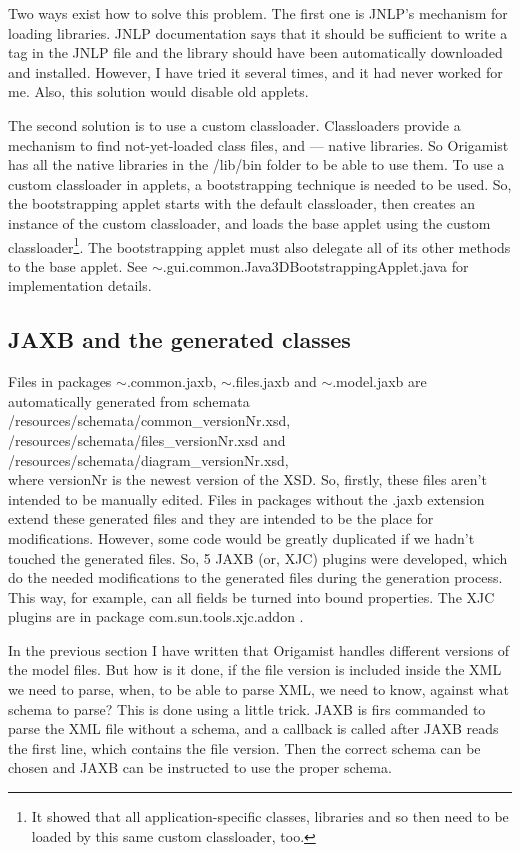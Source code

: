 Two ways exist how to solve this problem. The first one is JNLP's mechanism for loading libraries. JNLP documentation says that it should be sufficient to write a tag in the JNLP file and the library should have been automatically downloaded and installed. However, I have tried it several times, and it had never worked for me. Also, this solution would disable old applets.

The second solution is to use a custom classloader. Classloaders provide a mechanism to find not-yet-loaded class files, and --- native libraries. So Origamist has all the native libraries in the /lib/bin folder to be able to use them. To use a custom classloader in applets, a bootstrapping technique is needed to be used. So, the bootstrapping applet starts with the default classloader, then creates an instance of the custom classloader, and loads the base applet using the custom classloader\footnote{It showed that all application-specific classes, libraries and so then need to be loaded by this same custom classloader, too.}. The bootstrapping applet must also delegate all of its other methods to the base applet. See $\sim$.gui.common.Java3DBootstrappingApplet.java for implementation details.

\subsection{JAXB and the generated classes}
\label{ssec:jaxbClasses}
Files in packages $\sim$.common.jaxb, $\sim$.files.jaxb and $\sim$.model.jaxb are automatically generated from schemata /resources/schemata/common\_versionNr.xsd, \\ /resources/schemata/files\_versionNr.xsd and \\
/resources/schemata/diagram\_versionNr.xsd, \\
where versionNr is the newest version of the XSD. So, firstly, these files aren't intended to be manually edited. Files in packages without the .jaxb extension extend these generated files and they are intended to be the place for modifications. However, some code would be greatly duplicated if we hadn't touched the generated files. So, 5 JAXB (or, XJC) plugins were developed, which do the needed modifications to the generated files during the generation process. This way, for example, can all fields be turned into bound properties. The XJC plugins are in package com.sun.tools.xjc.addon .

In the previous section I have written that Origamist handles different versions of the model files. But how is it done, if the file version is included inside the XML we need to parse, when, to be able to parse XML, we need to know, against what schema to parse? This is done using a little trick. JAXB is firs commanded to parse the XML file without a schema, and a callback is called after JAXB reads the first line, which contains the file version. Then the correct schema can be chosen and JAXB can be instructed to use the proper schema.

